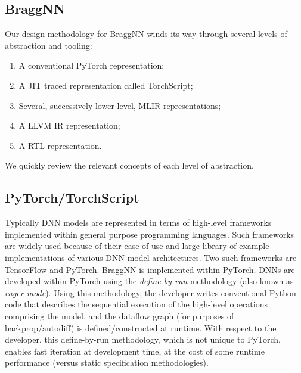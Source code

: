 \subsection{BraggNN}\label{subsec:braggnn}
Our design methodology for BraggNN winds its way through several levels of abstraction and tooling:

\begin{enumerate}
	\item A conventional PyTorch representation;
	\item A JIT traced representation called TorchScript;
	\item Several, successively lower-level, MLIR representations;
	\item A LLVM IR representation;
	\item A RTL representation.
\end{enumerate}

We quickly review the relevant concepts of each level of abstraction.

\subsection{PyTorch/TorchScript}\label{subsec:pytorch}

Typically DNN models are represented in terms of high-level frameworks implemented within general purpose programming languages.
Such frameworks are widely used because of their ease of use and large library of example implementations of various DNN model architectures.
Two such frameworks are TensorFlow and PyTorch.
BraggNN is implemented within PyTorch.
DNNs are developed within PyTorch using the \emph{define-by-run} methodology (also known as \emph{eager mode}).
Using this methodology, the developer writes conventional Python code that describes the sequential execution of the high-level operations comprising the model, and the dataflow graph (for purposes of backprop/autodiff) is defined/constructed at runtime.
With respect to the developer, this define-by-run methodology, which is not unique to PyTorch, enables fast iteration at development time, at the cost of some runtime performance (versus static specification methodologies).

